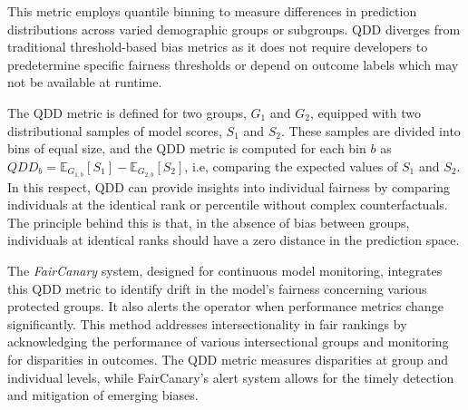 This metric employs quantile binning to measure differences in prediction distributions across varied demographic groups or subgroups. QDD diverges from traditional threshold-based bias metrics as it does not require developers to predetermine specific fairness thresholds or depend on outcome labels which may not be available at runtime.

The QDD metric
is defined for two groups, $G_1$ and $G_2$, equipped with two distributional samples of model scores, $S_1$ and $S_2$. These samples are divided into
 bins of equal size,
 and the QDD metric is computed for each bin $b$ as $Q D D_b=\mathbb{E}_{G_{1, b}}\left[S_1\right]-\mathbb{E}_{G_{2, b}}\left[S_2\right]$, i.e, comparing the expected values of $S_1$ and $S_2$.
In this respect, QDD can provide insights into individual fairness by comparing individuals at the identical rank or percentile without complex counterfactuals. The principle behind this is that, in the absence of bias between groups, individuals at identical ranks should have a zero distance in the prediction space.


The \emph{FairCanary} system, designed for continuous model monitoring, integrates this QDD metric to 
identify drift in the model's fairness concerning various protected groups. It also alerts the operator when performance metrics change significantly.
This method addresses intersectionality in fair rankings by acknowledging the performance of various intersectional groups and monitoring for disparities in outcomes. The QDD metric measures disparities at group and individual levels, while FairCanary's alert system allows for the timely detection and mitigation of emerging biases.




